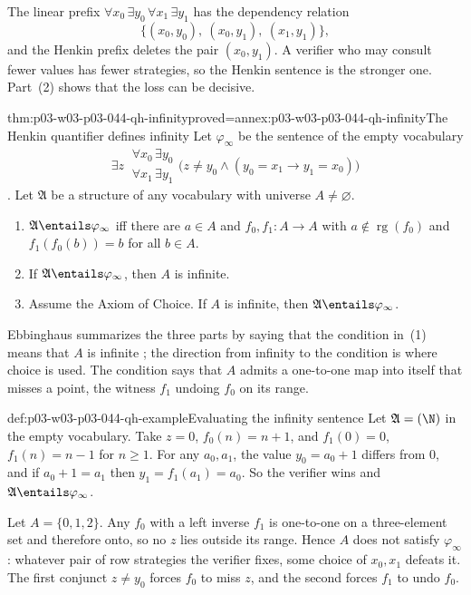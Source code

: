 The linear prefix \(\forall x_0\,\exists y_0\,\forall x_1\,\exists y_1\)
has the dependency relation
\[
 \{(x_0,y_0),\ (x_0,y_1),\ (x_1,y_1)\},
\]
and the Henkin prefix deletes the pair \((x_0,y_1)\).  A verifier who may consult fewer values has
fewer strategies, so the Henkin sentence is the stronger one.  Part~(2) shows
that the loss can be decisive.

\begin{hbtheorem}{thm:p03-w03-p03-044-qh-infinity}{proved=annex:p03-w03-p03-044-qh-infinity}{The Henkin quantifier defines infinity}
Let \(\varphi_\infty\) be the sentence of the empty vocabulary
\[
 \exists z\
 \begin{matrix}\forall x_0\,\exists y_0\\ \forall x_1\,\exists y_1\end{matrix}
 \bigl(z\neq y_0\land(y_0=x_1\to y_1=x_0)\bigr)
\]
\cite[p.~39]{Ebbinghaus1985ExtendedLogics}.  Let \(\mathfrak A\) be a
structure of any vocabulary with universe \(A\neq\varnothing\).
\begin{enumerate}
 \item \(\mathfrak A\entails\varphi_\infty\) iff there are \(a\in A\) and
       \(f_0,f_1:A\to A\) with \(a\notin\operatorname{rg}(f_0)\) and
       \(f_1(f_0(b))=b\) for all \(b\in A\).
 \item If \(\mathfrak A\entails\varphi_\infty\), then \(A\) is infinite.
 \item Assume the Axiom of Choice.  If \(A\) is infinite, then
       \(\mathfrak A\entails\varphi_\infty\).
\end{enumerate}
\end{hbtheorem}

Ebbinghaus summarizes the three parts by saying that the condition in~(1)
means that \(A\) is infinite \cite[p.~39]{Ebbinghaus1985ExtendedLogics}; the
direction from infinity to the condition is where choice is used.  The
condition says that \(A\) admits a one-to-one map into itself that misses a
point, the witness \(f_1\) undoing \(f_0\) on its range.

\begin{hbexample}{def:p03-w03-p03-044-qh-example}{Evaluating the infinity sentence}
Let \(\mathfrak A=(\N)\) in the empty vocabulary.  Take \(z=0\),
\(f_0(n)=n+1\), and \(f_1(0)=0\), \(f_1(n)=n-1\) for \(n\ge1\).  For any
\(a_0,a_1\), the value \(y_0=a_0+1\) differs from \(0\), and if
\(a_0+1=a_1\) then \(y_1=f_1(a_1)=a_0\).  So the verifier wins and
\(\mathfrak A\entails\varphi_\infty\).

Let \(A=\{0,1,2\}\).  Any \(f_0\) with a left inverse \(f_1\) is one-to-one
on a three-element set and therefore onto, so no \(z\) lies outside its
range.  Hence \(A\) does not satisfy \(\varphi_\infty\): whatever pair of
row strategies the verifier fixes, some choice of \(x_0,x_1\) defeats it.
The first conjunct \(z\neq y_0\) forces \(f_0\) to miss \(z\), and the
second forces \(f_1\) to undo \(f_0\).
\end{hbexample}

